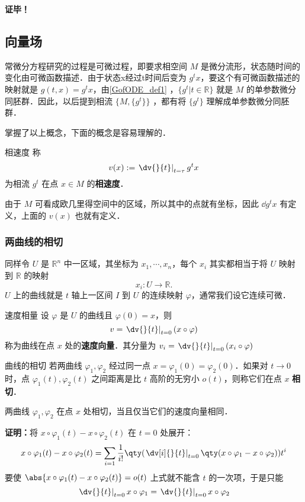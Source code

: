 \textbf{证毕！}
\subsection{向量场}
常微分方程研究的过程是可微过程，即要求相空间 $M$ 是微分流形，状态随时间的变化由可微函数描述．由于状态x经过t时间后变为 $g^tx$，要这个有可微函数描述的映射就是 $g(t,x)=g^tx$，由\autoref{GofODE_def1} ，$\{g^t|t\in\mathbb R\}$ 就是 $M$ 的单参数微分同胚群．因此，以后提到相流 $\{M,\{g^t\}\}$ ，都有将 $\{g^t\}$ 理解成单参数微分同胚群．

掌握了以上概念，下面的概念是容易理解的．
\begin{definition}{相速度}
称
\begin{equation}
v(x):=\left.\dv{}{t}\right|_{t=\tau} g^tx
\end{equation}
为相流 $g^t$ 在点 $x\in M$ 的\textbf{相速度}．
\end{definition}
由于 $M$ 可看成欧几里得空间中的区域，所以其中的点就有坐标，因此 $\dd g^t x$ 有定义，上面的 $v(x)$ 也就有定义．

\subsubsection{两曲线的相切}
同样令 $U$ 是 $\mathbb R^n$ 中一区域，其坐标为 $x_1,\cdots,x_n$，每个 $x_i$ 其实都相当于将 $U$ 映射到 $\mathbb R$ 的映射
\begin{equation}
x_i:U\rightarrow\mathbb R.
\end{equation}
$U$ 上的曲线就是 $t$ 轴上一区间 $I$ 到 $U$ 的连续映射 $\varphi$，通常我们设它连续可微．
\begin{definition}{速度相量}
设 $\varphi$ 是 $U$ 的曲线且 $\varphi(0)=x$，则
\begin{equation}
v=\left.\dv{}{t}\right|_{t=0}(x\circ\varphi)
\end{equation}
称为曲线在点 $x$ 处的\textbf{速度向量}．其分量为 $v_i=\left.\dv{}{t}\right|_{t=0}(x_i\circ\varphi)$
\end{definition}
\begin{definition}{曲线的相切}
若两曲线 $\varphi_1,\varphi_2$ 经过同一点 $x=\varphi_1(0)=\varphi_2(0)$．如果对 $t\rightarrow0$ 时，点 $\varphi_1(t),\varphi_2(t)$ 之间距离是比 $t$ 高阶的无穷小 $o(t)$，则称它们在点 $x$ \textbf{相切}．
\end{definition}

\begin{theorem}{}
两曲线 $\varphi_1,\varphi_2$ 在点 $x$ 处相切，当且仅当它们的速度向量相同．
\end{theorem}
\textbf{证明：}将 $x\circ\varphi_1(t)-x\circ\varphi_2(t)$ 在 $t=0$ 处展开：
\begin{equation}
x\circ\varphi_1(t)-x\circ\varphi_2(t)=\sum_{i=1}\frac{1}{i!}\qty(\left.\dv[i]{}{t}\right|_{t=0}\qty(x\circ\varphi_1-x\circ\varphi_2))t^i
\end{equation}
要使 $\abs{x\circ\varphi_1(t)-x\circ\varphi_2(t)}=o(t)$ 上式就不能含 $t$ 的一次项，于是只能
\begin{equation}
\left.\dv{}{t}\right|_{t=0}x\circ\varphi_1=\left.\dv{}{t}\right|_{t=0}x\circ\varphi_2
\end{equation}

